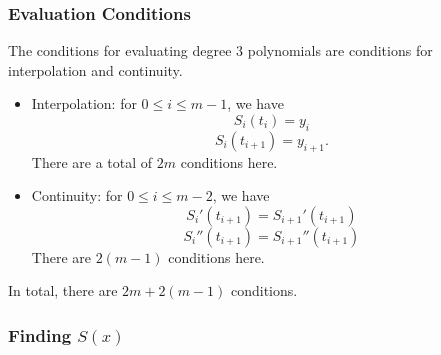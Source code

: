 \documentclass[letterpaper]{article}
\begin{document}
\subsubsection{Evaluation Conditions}
The conditions for evaluating degree 3 polynomials are conditions for interpolation and continuity.
\begin{itemize}
    \item Interpolation: for $0 \leq i \leq m - 1$, we have  
    \[S_{i}(t_i) = y_i\]
    \[S_{i}(t_{i + 1}) = y_{i + 1}.\]
    There are a total of $2m$ conditions here. 

    \item Continuity: for $0 \leq i \leq m - 2$, we have 
    \[S_{i}'(t_{i + 1}) = S_{i + 1}'(t_{i + 1})\]
    \[S_{i}''(t_{i + 1}) = S_{i + 1}''(t_{i + 1})\]
    There are $2(m - 1)$ conditions here.
\end{itemize}
In total, there are $2m + 2(m - 1)$ conditions. 

\subsubsection{Finding \texorpdfstring{$S(x)$}{S(x)}}
\end{document}
